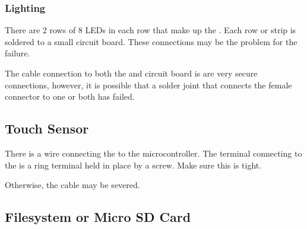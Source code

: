 \subsubsection{Lighting}

 

\par\bigskip

There are \num{2} rows of \num{8} LEDs in each row that make up the .
Each row or strip is soldered to a small circuit board.  These connections
may be the problem for the failure.

\par\medskip

The cable connection to both the  and circuit board is are very
secure connections, however, it is possible that a solder joint that connects
the female connector to one or both has failed.

\subsection{Touch Sensor}

 

\par\bigskip

There is a wire connecting the  to the microcontroller.  The terminal
connecting to the  is a ring terminal held in place by a screw.  Make
sure this is tight.

\par\medskip

Otherwise, the cable may be severed.

\subsection{Filesystem or Micro SD Card}

 

\par\bigskip

